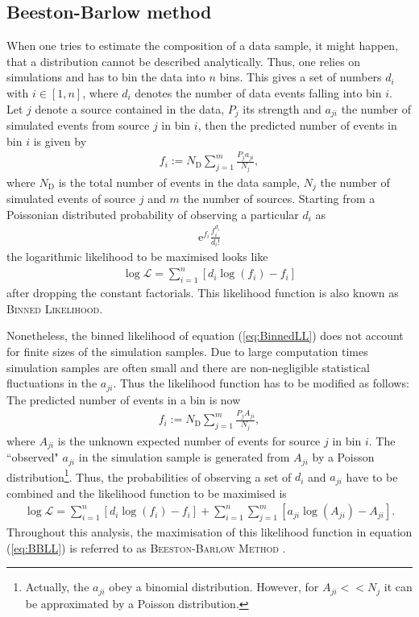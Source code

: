 \subsection{Beeston-Barlow method}
\label{sec:BeestonBarlow}
When one tries to estimate the composition of a data sample, it might happen, that a distribution cannot be described analytically.
Thus, one relies on simulations and has to bin the data into $n$ bins.
This gives a set of numbers ${d_i}$ with $i \in [1,n]$, where $d_i$ denotes the number of data events falling into bin $i$.
Let $j$ denote a source contained in the data, $P_j$ its strength and $a_{ji}$ the number of simulated events from source $j$ in bin $i$, then the predicted number of events in bin $i$ is given by
\begin{align}
    f_i := N_\text{D} \sum_{j=1}^{m} \frac{P_j a_{ji}}{N_j},
\end{align}
where $N_\text{D}$ is the total number of events in the data sample, $N_j$ the number of simulated events of source $j$ and $m$ the number of sources.
Starting from a Poissonian distributed probability of observing a particular $d_i$ as
\begin{align}
    \mathrm{e}^{f_i} \frac{f_i^{d_i}}{d_i!}
\end{align}
the logarithmic likelihood to be maximised looks like
\begin{align}
    \log \mathcal{L} = \sum_{i=1}^{n} \left[d_i \log(f_i) - f_i\right] \label{eq:BinnedLL}
\end{align}
after dropping the constant factorials.
This likelihood function is also known as \textsc{Binned Likelihood}.

Nonetheless, the binned likelihood of equation (\ref{eq:BinnedLL}) does not account for finite sizes of the simulation samples.
Due to large computation times simulation samples are often small and there are non-negligible statistical fluctuations in the $a_{ji}$.
Thus the likelihood function has to be modified as follows:
The predicted number of events in a bin is now
\begin{align}
    f_i := N_\text{D} \sum_{j=1}^{m} \frac{P_j A_{ji}}{N_j},
\end{align}
where $A_{ji}$ is the unknown expected number of events for source $j$ in bin $i$.
The ``observed" $a_{ji}$ in the simulation sample is generated from $A_{ji}$ by a Poisson distribution\footnote{Actually, the $a_{ji}$ obey a binomial distribution. However, for $A_{ji} << N_j$ it can be approximated by a Poisson distribution.}.
Thus, the probabilities of observing a set of ${d_i}$ and $a_{ji}$ have to be combined and the likelihood function to be maximised is
\begin{align}
    \log \mathcal{L} = \sum_{i=1}^{n} \left[d_i \log(f_i) - f_i\right] + \sum_{i=1}^{n} \sum_{j=1}^{m} \left[a_{ji} \log(A_{ji}) - A_{ji}\right]. \label{eq:BBLL}
\end{align}
Throughout this analysis, the maximisation of this likelihood function in equation (\ref{eq:BBLL}) is referred to as \textsc{Beeston-Barlow Method} \cite{BeestonBarlow}.
